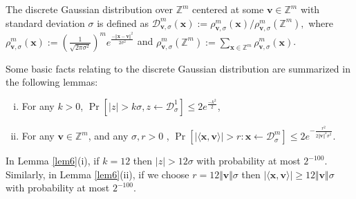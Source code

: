 \documentclass[runningheads]{llncs}
\begin{document}






\begin{definition} The discrete Gaussian distribution over $\mathbb{Z}^m$ centered at some $\mathbf{v} \in \mathbb{Z}^m$ with standard deviation $\sigma$ is defined as $\mathcal{D}_{\mathbf{v}, \sigma}^m(\mathbf{x}):=\rho_{\mathbf{v}, \sigma}^m(\mathbf{x})/\rho_{\mathbf{v}, \sigma}^m(\mathbb{Z}^m),$ where $\rho_{\mathbf{v}, \sigma}^m(\mathbf{x}):=\left( \frac{1}{\sqrt{2\pi \sigma^2}}\right)^m e^{\frac{-\Vert \mathbf{x}-\mathbf{v}\Vert^2 }{2 \sigma^2}}$ and $\rho_{\mathbf{v}, \sigma}^m(\mathbb{Z}^m):=\sum_{\mathbf{x}\in \mathbb{Z}^m}\rho_{\mathbf{v}, \sigma}^m(\mathbf{x})$.
	
\end{definition}
   Some basic facts relating to the discrete Gaussian distribution are summarized in the following lemmas:    
\begin{lemma} \label{lem6} 
	\begin{enumerate}[(i)]
		\item For any $k>0$, $\Pr[\vert z \vert >k\sigma, z\leftarrow \mathcal{D}_\sigma^1] \leq 2e^{\frac{-k^2}{2}}$,
		\item     For any $\mathbf{v} \in \mathbb{Z}^m$, and any $\sigma, r>0$ ,
		$\Pr\left[ \vert \langle \mathbf{x},\mathbf{v}\rangle \vert>r: \mathbf{x}\leftarrow \mathcal{D}_\sigma^m\right] \leq 2e^{-\frac{r^2}{2\Vert \mathbf{v}\Vert^2\sigma^2}}.$
	\end{enumerate}
\end{lemma}

\begin{remark}\label{rem1}
	In Lemma \ref{lem6}(i), if $k=12$ then
	$\vert z \vert > 12 \sigma$ with probability at most $2^{-100}$. 
	Similarly, in Lemma \ref{lem6}(ii), if we choose $r=12\Vert \mathbf{v} \Vert \sigma $ then
	$\vert \langle \mathbf{x},\mathbf{v}\rangle \vert \geq 12\Vert \mathbf{v} \Vert \sigma$ with probability at most $2^{-100}$. 
\end{remark}    
\end{document}
